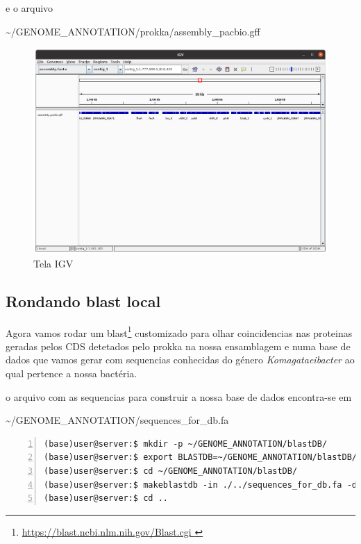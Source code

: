 \documentclass[letter,11pt]{book}
\begin{document}
e o arquivo

\sim/GENOME\_ANNOTATION/prokka/assembly\_pacbio.gff

\begin{figure}[ht]
\centering
   \includegraphics[width=12cm]{Figs/igv_gff.png}
  \caption[Visualização do arquivo de anotações .gff na ensamblagem]{\label{IGV}Tela IGV}
\end{figure}


\subsection{Rondando blast local}

Agora vamos rodar um blast\footnote{\url{https://blast.ncbi.nlm.nih.gov/Blast.cgi
}} customizado para olhar coincidencias nas proteinas geradas pelos CDS detetados pelo prokka na nossa ensamblagem e numa base de dados que vamos gerar com sequencias conhecidas do género \emph{Komagataeibacter} ao qual pertence a nossa bactéria.

o arquivo com as sequencias para construir a nossa base de dados encontra-se em 

\sim/GENOME\_ANNOTATION/sequences\_for\_db.fa

\begin{Verbatim}[commandchars=!\{\}, numbers=left,label= Criando base de dados customizada para o blast ,frame=topline,fontsize=\scriptsize]
(base)user@server:$ mkdir -p ~/GENOME_ANNOTATION/blastDB/
(base)user@server:$ export BLASTDB=~/GENOME_ANNOTATION/blastDB/
(base)user@server:$ cd ~/GENOME_ANNOTATION/blastDB/
(base)user@server:$ makeblastdb -in ./../sequences_for_db.fa -dbtype 'prot' -out myDB
(base)user@server:$ cd ..
\end{Verbatim}
\end{document}
